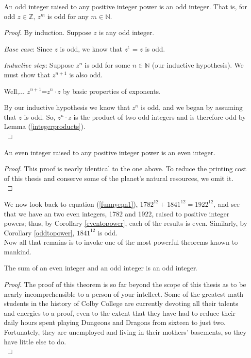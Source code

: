 \begin{cor}\label{oddtopower}
An odd integer raised to any positive integer power is an odd integer.
That is, for odd $z\in\mathbb{Z}$, $z^m$ is odd for any $m\in\mathbb{N}$.
\end{cor}

\begin{proof}
By induction. Suppose $z$ is any odd integer.

\emph{Base case}: Since $z$ is odd, we know that $z^1=z$ is odd.

\emph{Inductive step}: Suppose $z^n$ is odd for some $n\in\mathbb{N}$ 
(our inductive hypothesis). We must show that $z^{n+1}$ is also odd.

Well,... $z^{n+1}$=$z^n\cdot z$ by basic properties of exponents.

By our inductive hypothesis we know that $z^n$ is odd, and we began
by assuming that $z$ is odd. So, $z^n\cdot z$ is the product of two odd 
integers and is therefore odd by Lemma (\ref{integerproducts}).\\
\end{proof}

\begin{cor}\label{eventopower}
An even integer raised to any positive integer power is an even integer.
\end{cor}

\begin{proof}
This proof is nearly identical to the one above. To reduce the printing
cost of this thesis and conserve some of the planet's natural resources,
we omit it.\\
\end{proof}

We now look back to equation (\ref{funnyeqn1}), $1782^{12}+1841^{12}=1922^{12}$,
and see that we have an two even integers, 1782 and 1922, raised to 
positive integer powers; thus, by Corollary \ref{eventopower}, each of 
the results is even. Similarly, by Corollary \ref{oddtopower}, $1841^{12}$
is odd.\\

Now all that remains is to invoke one of the most powerful theorems known
to mankind.

\begin{thm}\label{awesometheorem}
The sum of an even integer and an odd integer is an odd integer.
\end{thm}

\begin{proof}
The proof of this theorem is so far beyond the scope of this thesis as
to be nearly incomprehensible to a person of your intellect. Some of the 
greatest math students in the history of Colby College are currently 
devoting all their talents and energies to a proof, even to the extent 
that they have had to reduce their daily hours spent playing Dungeons 
and Dragons from sixteen to just two. Fortunately, they are unemployed
and living in their mothers' basements, so they have little else to do.\\
\end{proof}

